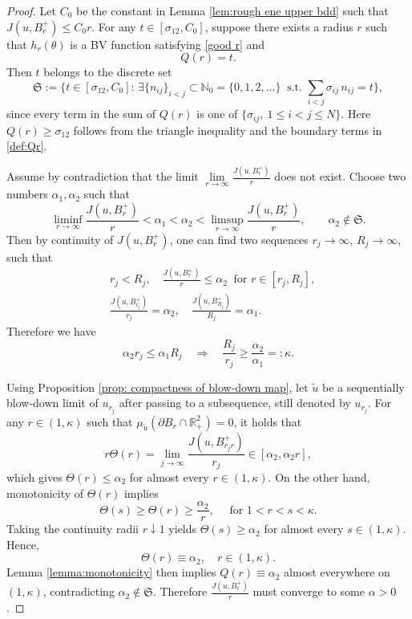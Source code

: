 \documentclass[leqno,11pt]{amsart}
\let\pa=\partial
\let\al=\alpha
\let\f=\frac
\let\T=\Theta
\let\pa=\partial
\theoremstyle{remark}
\newcommand{\BR}{\mathbb{R}}
\newcommand{\tu}{\tilde{u}}
\begin{document}
\begin{proof}
    Let $C_0$ be the constant in Lemma \ref{lem:rough ene upper bdd} such that $J(u,B_r^+)\leq C_0 r$. For any $t\in [\sigma_{12}, C_0]$, suppose there exists a radius $r$ such that $h_r(\theta)$ is a BV function satisfying \eqref{good r} and 
    \begin{equation*}
        Q(r)=t.
    \end{equation*}
    Then $t$ belongs to the discrete set
    \begin{equation*}
        \mathfrak{S}:=\{t\in [\sigma_{12},C_0]: \,\exists \{n_{ij}\}_{i<j}\subset \mathbb{N}_0=\{0,1,2,...\}\ \text{ s.t. }\sum_{i<j} \sigma_{ij}\,n_{ij}=t\},
    \end{equation*}
    since every term in the sum of $Q(r)$ is one of $\{\sigma_{ij},\ 1\leq i<j\leq N\}$. Here $Q(r)\geq \sigma_{12}$ follows from the triangle inequality and the boundary terms in \eqref{def:Qr}. 

    Assume by contradiction that the limit $\lim\limits_{r\to\infty} \f{J(u,B_r^+)}{r}$ does not exist. Choose two numbers $\al_1, \al_2$ such that
    \[
    \liminf_{r\to\infty}\f{J(u,B_r^+)}{r}<\al_1<\al_2<\limsup_{r\to\infty}\f{J(u,B_r^+)}{r},\qquad \al_2\not\in \mathfrak{S}.
    \]
    Then by continuity of $J(u,B_r^+)$, one can find two sequences $r_j\to\infty$, $R_j\to \infty$, such that 
    \begin{align*}
        &r_j<R_j,\quad \f{J(u,B_r^+)}{r}\leq \al_2 \ \text{ for }r\in[r_j,R_j],\\
        &\f{J(u,B_{r_j}^+)}{r_j}=\al_2,\quad \f{J(u,B_{R_j}^+)}{R_j}=\al_1.
    \end{align*}
    Therefore we have 
    \begin{equation*}
        \al_2r_j\leq \al_1R_j\quad \Rightarrow\quad\f{R_j}{r_j}\geq \f{\al_2}{\al_1}=:\kappa.
    \end{equation*}

    Using Proposition \ref{prop: compactness of blow-down map}, let $\tu$ be a sequentially blow-down limit of $u_{r_j}$ after passing to a subsequence, still denoted by $u_{r_j}$. For any $r\in (1,\kappa)$ such that $\mu_{\tu}(\pa B_r\cap \BR_+^2)=0$, it holds that 
    \begin{equation*}
        r\T(r)=\lim_{j\to\infty} \f{J(u,B_{r_jr}^+)}{r_j} \in [\al_2,\al_2r], 
    \end{equation*}
    which gives $\T(r)\leq \al_2$ for almost every $r\in (1,\kappa)$. On the other hand, monotonicity of $\T(r)$ implies 
    \begin{equation*}
        \T(s)\geq \T(r)\geq  \frac{\al_2}{r}, \quad\text{ for } 1<r<s<\kappa. 
    \end{equation*}
    Taking the continuity radii $r\downarrow 1$ yields $\T(s)\geq \al_2$ for almost every $s\in (1,\kappa)$. Hence,
    \[
    \T(r)\equiv \al_2, \quad r\in(1,\kappa).
    \]
    Lemma \ref{lemma:monotonicity} then implies $Q(r)\equiv \al_2$ almost everywhere on $(1,\kappa)$, contradicting  $\al_2\notin \mathfrak{S}$. Therefore $\f{J(u,B_r^+)}{r}$ must converge to some $\al>0$. 


\end{proof}
\end{document}
